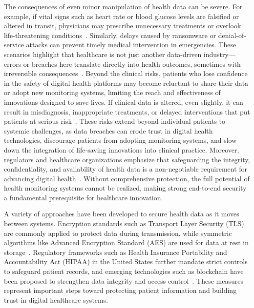 \documentclass[review]{elsarticle}
\begin{document}
The consequences of even minor manipulation of health data can be severe. For example, if vital signs such as heart rate or blood glucose levels are falsified or altered in transit, physicians may prescribe unnecessary treatments or overlook life-threatening conditions~\cite{10500025}. Similarly, delays caused by ransomware or denial-of-service attacks can prevent timely medical intervention in emergencies. These scenarios highlight that healthcare is not just another data-driven industry—errors or breaches here translate directly into health outcomes, sometimes with irreversible consequences~\cite{10500025,atadoga2024comparative}. Beyond the clinical risks, patients who lose confidence in the safety of digital health platforms may become reluctant to share their data or adopt new monitoring systems, limiting the reach and effectiveness of innovations designed to save lives. If clinical data is altered, even slightly, it can result in misdiagnosis, inappropriate treatments, or delayed interventions that put patients at serious risk~\cite{seh2020healthcare}. These risks extend beyond individual patients to systemic challenges, as data breaches can erode trust in digital health technologies, discourage patients from adopting monitoring systems, and slow down the integration of life-saving innovations into clinical practice. Moreover, regulators and healthcare organizations emphasize that safeguarding the integrity, confidentiality, and availability of health data is a non-negotiable requirement for advancing digital health~\cite{pandey2020key}. Without comprehensive protection, the full potential of health monitoring systems cannot be realized, making strong end-to-end security a fundamental prerequisite for healthcare innovation.

A variety of approaches have been developed to secure health data as it moves between systems. Encryption standards such as Transport Layer Security (TLS) are commonly applied to protect data during transmission, while symmetric algorithms like Advanced Encryption Standard (AES) are used for data at rest in storage~\cite{elhoseny2018secure}. Regulatory frameworks such as Health Insurance Portability and Accountability Act (HIPAA) in the United States further mandate strict controls to safeguard patient records, and emerging technologies such as blockchain have been proposed to strengthen data integrity and access control~\cite{luxton2012mhealth}. These measures represent important steps toward protecting patient information and building trust in digital healthcare systems.
\end{document}
